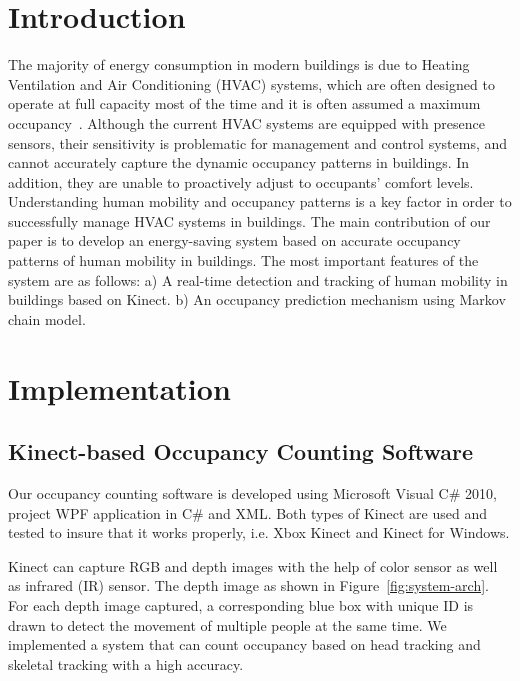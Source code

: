 \documentclass{sig-alternate}
\begin{document}
\section{Introduction}
\label{sec:introduction}
The majority of energy consumption in modern buildings is due to
Heating Ventilation and Air Conditioning (HVAC) systems, which are
often designed to operate at full capacity most of the time and it is
often assumed a maximum occupancy~\cite{ref:Wang2011}. Although the
current HVAC systems are equipped with presence sensors, their
sensitivity is problematic for management and control systems, and
cannot accurately capture the dynamic occupancy patterns in
buildings. In addition, they are unable to proactively adjust to
occupants' comfort levels. Understanding human mobility and occupancy
patterns is a key factor in order to successfully manage HVAC systems
in buildings. The main contribution of our paper is to develop an
energy-saving system based on accurate occupancy patterns of human
mobility in buildings. The most important features of the system are
as follows: a) A real-time detection and tracking of human mobility in
buildings based on Kinect. b) An occupancy prediction mechanism using
Markov chain model. %
\par






\section{Implementation}
\label{sec:implementation}

\subsection{Kinect-based Occupancy Counting Software}

Our occupancy counting software is developed using Microsoft Visual
C\# 2010, project WPF application in C\# and XML\@. Both types of
Kinect are used and tested to insure that it works properly, i.e. Xbox
Kinect and Kinect for Windows.    
\par

Kinect can capture RGB and depth images with the help of color sensor
as well as infrared (IR) sensor. The depth image as shown in
Figure~\ref{fig:system-arch}. For each depth image captured, a
corresponding blue box with unique ID is drawn to detect the movement
of multiple people at the same time. We implemented a system that can
count occupancy based on head tracking and skeletal tracking with a
high accuracy.  
\end{document}
